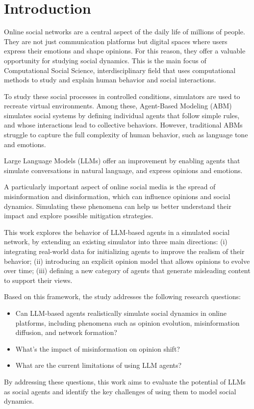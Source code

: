 \section{Introduction}
\label{sec:introduction}

Online social networks are a central aspect of the daily life of millions of people. They are not just communication platforms but digital spaces where users express their emotions and shape opinions.
For this reason, they offer a valuable opportunity for studying social dynamics.
This is the main focus of Computational Social Science, interdisciplinary field that uses computational methods to study and explain human behavior and social interactions.

To study these social processes in controlled conditions, simulators are used to recreate virtual environments.
Among these, Agent-Based Modeling (ABM) simulates social systems by defining individual agents that follow simple rules, and whose interactions lead to collective behaviors.
However, traditional ABMs struggle to capture the full complexity of human behavior, such as language tone and emotions.

Large Language Models (LLMs) offer an improvement by enabling agents that simulate conversations in natural language, and express opinions and emotions.

A particularly important aspect of online social media is the spread of misinformation and disinformation, which can influence opinions and social dynamics. 
Simulating these phenomena can help us better understand their impact and explore possible mitigation strategies.

This work explores the behavior of LLM-based agents in a simulated social network, by extending an existing simulator into three main directions:
(i) integrating real-world data for initializing agents to improve the realism of their behavior;
(ii) introducing an explicit opinion model that allows opinions to evolve over time;
(iii) defining a new category of agents that generate misleading content to support their views.


Based on this framework, the study addresses the following research questions:
\begin{itemize}
    \item Can LLM-based agents realistically simulate social dynamics in online platforms, including phenomena such as opinion evolution, misinformation diffusion, and network formation?
    \item What's the impact of misinformation on opinion shift?
    \item What are the current limitations of using LLM agents?
\end{itemize}

By addressing these questions, this work aims to evaluate the potential of LLMs as social agents and identify the key challenges of using them to model social dynamics.
